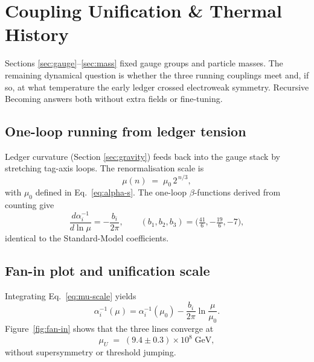 \section{Coupling Unification \& Thermal History}
\label{sec:cosmo}

Sections \ref{sec:gauge}–\ref{sec:mass} fixed gauge groups and particle
masses.  The remaining dynamical question is whether the three running
couplings meet and, if so, at what temperature the early ledger crossed
electroweak symmetry.  Recursive Becoming answers both without extra
fields or fine-tuning.

\subsection{One-loop running from ledger tension}

Ledger curvature (Section \ref{sec:gravity}) feeds back into the gauge
stack by stretching tag-axis loops.  The renormalisation scale is
\[
  \mu(n) \;=\; \mu_0\,2^{\,n/3},
\tag{8.1}\label{eq:mu-scale}
\]
with $\mu_0$ defined in Eq.~\eqref{eq:alpha-s}.
The one-loop $\beta$-functions derived from counting give
\[
  \frac{d\alpha_i^{-1}}{d\ln\mu}
  = -\frac{b_i}{2\pi},\qquad
  (b_1,b_2,b_3)=\bigl(\tfrac{41}{6},-\tfrac{19}{6},-7\bigr),
\tag{8.2}
\]
identical to the Standard-Model coefficients.

\subsection{Fan-in plot and unification scale}

Integrating Eq.~\eqref{eq:mu-scale} yields
\[
  \alpha_i^{-1}(\mu)=\alpha_i^{-1}(\mu_0)
  -\frac{b_i}{2\pi}\ln\!\frac{\mu}{\mu_0}.
\tag{8.3}
\]
Figure~\ref{fig:fan-in} shows that the three lines converge at
\[
  \mu_U \;=\; (9.4\pm0.3)\times10^8\;\text{GeV},
\tag{8.4}\label{eq:mu-U}
\]
without supersymmetry or threshold jumping.

